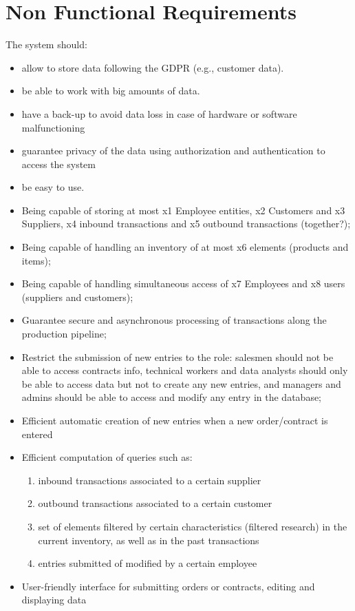 \section{Non Functional Requirements}
The system should:
\begin{itemize}
    \item allow to store data following the GDPR (e.g., customer data).
    \item be able to work with big amounts of data.
    \item have a back-up to avoid data loss in case of hardware or software malfunctioning
    \item guarantee privacy of the data using authorization and authentication to access the system
    \item be easy to use.
    \item Being capable of storing at most x1 Employee entities, x2 Customers and x3 Suppliers, x4 inbound transactions and x5 outbound transactions (together?);
    \item Being capable of handling an inventory of at most x6 elements (products and items);
    \item Being capable of handling simultaneous access of x7 Employees and x8 users (suppliers and customers);
    \item Guarantee secure and asynchronous processing of transactions along the production pipeline;
    \item Restrict the submission of new entries to the role: salesmen should not be able to access contracts info, technical workers and data analysts should only be able to access data but not to create any new entries, and managers and admins should be able to access and modify any entry in the database;
    \item Efficient automatic creation of new entries when a new order/contract is entered 
    \item Efficient computation of queries such as:
    \begin{enumerate}
    \item inbound transactions associated to a certain supplier
    \item outbound transactions associated to a certain customer
   \item set of elements filtered by certain characteristics (filtered research) in the current inventory, as well as in the past transactions
   \item entries submitted of modified by a certain employee
    \end{enumerate}
    \item User-friendly interface for submitting orders or contracts, editing and displaying data
\end{itemize}

